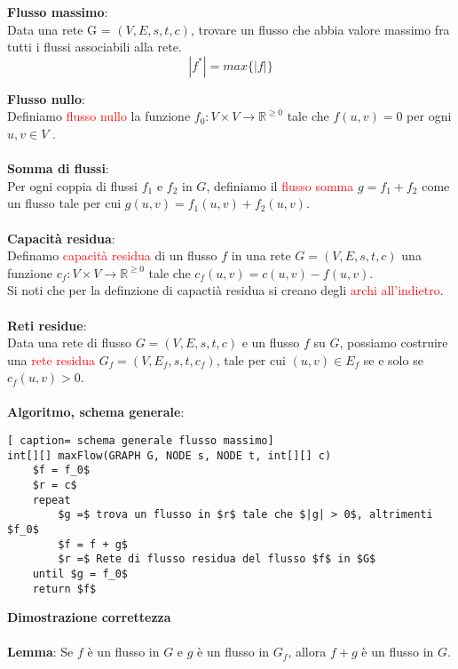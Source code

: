 \documentclass[../cheatSheetAlgoritmi.tex]{subfiles}
\begin{document}
\begin{flushleft}
\textbf{Flusso massimo}:\\
Data una rete G = $(V, E, s, t, c)$, trovare un flusso che abbia valore massimo fra tutti i flussi associabili alla rete.
\begin{equation*}
	|f^{*}| = max\{|f|\}
\end{equation*}
\end{flushleft}
\textbf{Flusso nullo}:\\
Definiamo \textcolor{red}{flusso nullo} la funzione $f_{0} : V \times V \rightarrow \mathbb{R}^{\geq 0}$ tale che $f(u, v) = 0$ per ogni $u, v \in V$ . \\\\
\textbf{Somma di flussi}:\\
Per ogni coppia di flussi $f_1$ e $f_2$ in $G$, definiamo il \textcolor{red}{flusso somma} $g = f_1 + f_2$ come un flusso tale per cui $g(u, v) = f_1(u, v) + f_2(u, v)$. \\\\
\textbf{Capacità residua}:\\
Definamo \textcolor{red}{capacità residua} di un flusso $f$ in una rete $G = (V, E, s, t, c)$ una funzione $c_f : V \times V \rightarrow \mathbb{R}^{\geq 0}$ tale che $c_f(u, v) = c(u, v) - f(u, v)$. \\
Si noti che per la definzione di capactià residua si creano degli \textcolor{red}{archi all'indietro}. \\\\
\textbf{Reti residue}:\\
Data una rete di flusso $G = (V, E, s, t, c)$ e un flusso $f$ su $G$, possiamo costruire una \textcolor{red}{rete residua} $G_f = (V, E_f, s, t, c_f)$, tale per cui $(u, v) \in E_f$ se e solo se $c_f(u, v) > 0$. \\\\
\textbf{Algoritmo, schema generale}:
 \begin{lstlisting}[ caption= schema generale flusso massimo]
int[][] maxFlow(GRAPH G, NODE s, NODE t, int[][] c)
	$f = f_0$
	$r = c$
	repeat 
		$g =$ trova un flusso in $r$ tale che $|g| > 0$, altrimenti $f_0$
		$f = f + g$
		$r =$ Rete di flusso residua del flusso $f$ in $G$
	until $g = f_0$ 
	return $f$
\end{lstlisting}
\textbf{Dimostrazione correttezza} \\\\
\textbf{Lemma}: Se $f$ è un flusso in $G$ e $g$ è un flusso in $G_f$, allora $f+g$ è un flusso in $G$. \\\\
\end{document}
